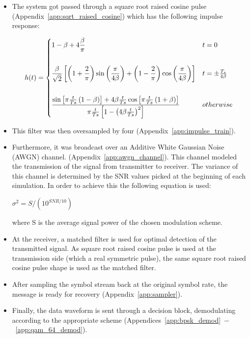 \documentclass[]{article}
\begin{document}
\begin{itemize}
\item The system got passed through a square root raised cosine pulse (Appendix~\ref{app:sqrt_raised_cosine}) which has the following impulse response:

 \[
 h(t) = \begin{dcases*}
        1-\beta+4\frac{\beta}{\pi} &  $t = 0$\\ \\        
        \frac{\beta}{\sqrt{2}}\left[\left(1+\frac{2}{\pi}\right)\sin\left(\frac{\pi}{4\beta}\right)+\left(1-\frac{2}{\pi}\right)\cos\left(\frac{\pi}{4\beta}\right)\right] & $t=\pm \frac{T_s}{4\beta}$ \\ \\
        \frac{\sin\left[\pi\frac{t}{Ts}\left(1-\beta\right)\right]+4\beta\frac{t}{Ts}\cos\left[\pi\frac{t}{Ts}\left(1+\beta\right)\right]}{\pi\frac{t}{Ts}\left[1-\left(4\beta\frac{t}{Ts}\right)^2\right]} & $otherwise$ \\
        \end{dcases*}
\]

\item This filter was then oversampled by four (Appendix~\ref{app:impulse_train}).
\item Furthermore, it was broadcast over an Additive White Gaussian Noise (AWGN) channel. (Appendix~\ref{app:awgn_channel}). This channel modeled the transmission of the signal from transmitter to receiver. The variance of this channel is determined by the SNR values picked at the beginning of each simulation. In order to achieve this the following equation is used:

$\sigma^2 = S/(10^{SNR/10})$

where S is the average signal power of the chosen modulation scheme.

\item At the receiver, a matched filter is used for optimal detection of the transmitted signal. As square root raised cosine pulse is used at the transmission side (which a real symmetric pulse), the same square root raised cosine pulse shape is used as the matched filter.  

\item After sampling the symbol stream back at the original symbol rate, the message is ready for recovery (Appendix~\ref{app:sampler}).

\item Finally, the data waveform is sent through a decision block, demodulating according to the appropriate scheme (Appendices~\ref{app:bpsk_demod}~$-$~\ref{app:qam_64_demod}).

\end{itemize}
\end{document}
